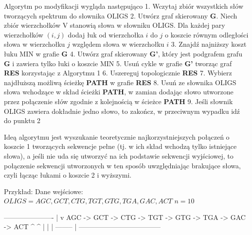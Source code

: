 \documentclass[a4paper]{article}
\begin{document}
Algorytm po modyfikacji wygląda następująco
1. Wczytaj zbiór wszystkich słów tworzących spektrum do słownika OLIGS
2. Utwórz graf skierowany {\bf G}. Niech zbiór wierzchołków V stanowią słowa w słowniku OLIGS. Dla każdej pary wierzchołków $(i,j)$ dodaj łuk od wierzchołka $i$ do $j$ o koszcie równym odległości słowa w wierzchołku $j$ względem słowa w wierzchołku $i$
3. Znajdź najniższy koszt łuku MIN w grafie {\bf G}
4. Utwórz graf skierowany {\bf G'}, który jest podgrafem grafu {\bf G} i zawiera tylko łuki o koszcie MIN
5. Usuń cykle w grafie {\bf G'} tworząc graf {\bf RES} korzystając z Algorytmu 1
6. Uszereguj topologicznie {\bf RES}
7. Wybierz najdłuższą możliwą ścieżkę {\bf PATH} w grafie {\bf RES}
8. Usuń ze słownika OLIGS słowa wchodzące w skład ścieżki {\bf PATH}, w zamian dodając słowo utworzone przez połączenie słów zgodnie z kolejnością w ścieżce {\bf PATH}
9. Jeśli słownik OLIGS zawiera dokładnie jedno słowo, to zakończ, w przeciwnym wypadku idź do punktu 2

Ideą algorytmu jest wyszukanie teoretycznie najkorzystniejszych połączeń o koszcie 1 tworzących sekwencje pełne (tj. w ich skład wchodzą tylko istniejące słowa), a jeśli nie uda się utworzyć na ich podstawie sekwencji wyjściowej, to połączenie sekwencji utworzonych w ten sposób uwzględniając brakujące słowa, czyli łącząc łukami o koszcie 2 i wyższymi. 

Przykład:
Dane wejściowe:
$OLIGS = { AGC, GCT, CTG, TGT, GTG, TGA, GAC, ACT }$
$n = 10$

               ----------------------
               |                    v
AGC -> GCT -> CTG -> TGT -> GTG -> TGA -> GAC -> ACT
               ^      ^      |                    |
               |      --------                    |
               ------------------------------------
\end{document}

